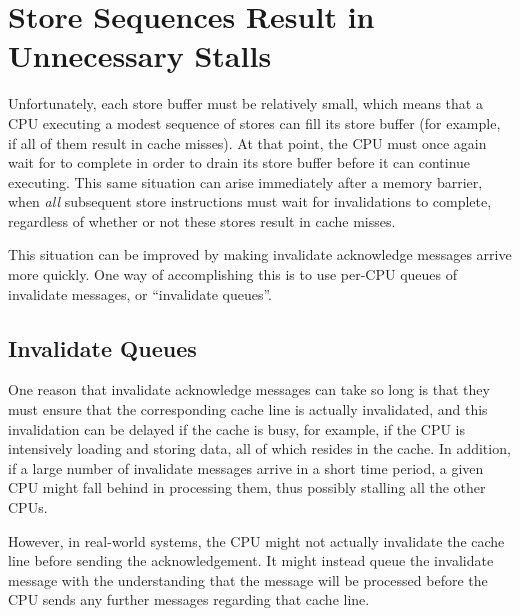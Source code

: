 \section{Store Sequences Result in Unnecessary Stalls}
\label{sec:app:whymb:Store Sequences Result in Unnecessary Stalls}

Unfortunately, each store buffer must be relatively small, which means
that a CPU executing a modest sequence of stores can fill its store
buffer (for example, if all of them result in cache misses).
At that point, the CPU must once again wait for  to complete
in order to drain its store buffer before it can continue executing.
This same situation can arise immediately after a memory barrier, when
\emph{all} subsequent store instructions must wait for invalidations to
complete, regardless of whether or not these stores result in cache misses.

This situation can be improved by making invalidate acknowledge
messages arrive more quickly.
One way of accomplishing this is to use per-CPU queues of
invalidate messages, or ``invalidate queues''.

\subsection{Invalidate Queues}
\label{sec:app:whymb:Invalidate Queues}

One reason that invalidate acknowledge messages can take so long
is that they must ensure that the corresponding cache line is
actually invalidated, and this invalidation can be delayed if
the cache is busy, for example, if the CPU is intensively loading
and storing data, all of which resides in the cache.
In addition, if a large number of invalidate messages arrive
in a short time period, a given CPU might fall behind in processing
them, thus possibly stalling all the other CPUs.

However, in real-world systems, the CPU might not actually invalidate
the cache line before sending the acknowledgement.
It might instead queue the invalidate message with the understanding
that the message will be processed before the CPU sends any further
messages regarding that cache line.

